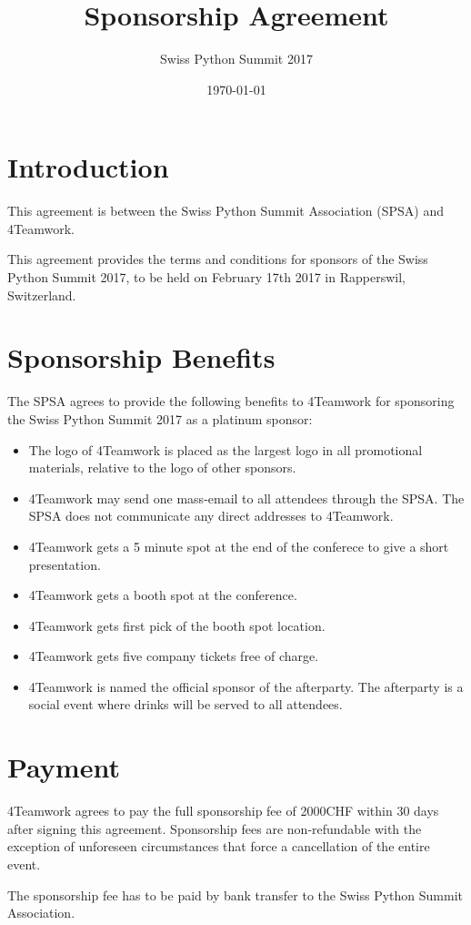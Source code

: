 \documentclass[11pt,enlargefirstpage=true,headlines=4]{scrartcl}
\title{Sponsorship Agreement}
\subtitle{Swiss Python Summit 2017}
\date{\today} %
\begin{document}
    \maketitle

    \section{Introduction}

    This agreement is between the Swiss Python Summit Association (SPSA) and
    4Teamwork.

    This agreement provides the terms and conditions for sponsors of the Swiss
    Python Summit 2017, to be held on February 17th 2017 in Rapperswil,
    Switzerland.

    \section{Sponsorship Benefits}

    The SPSA agrees to provide the following benefits to 4Teamwork for sponsoring
    the Swiss Python Summit 2017 as a platinum sponsor:

    \begin{itemize}
        \item The logo of 4Teamwork is placed as the largest logo in all promotional materials, relative to the logo of other sponsors.
        \item 4Teamwork may send one mass-email to all attendees through the SPSA. The SPSA does not communicate any direct addresses to 4Teamwork.
        \item 4Teamwork gets a 5 minute spot at the end of the conferece to give a short presentation.
        \item 4Teamwork gets a booth spot at the conference.
        \item 4Teamwork gets first pick of the booth spot location.
        \item 4Teamwork gets five company tickets free of charge.
        \item 4Teamwork is named the official sponsor of the afterparty. The afterparty is a social event where drinks will be served to all attendees.
    \end{itemize}

    \section{Payment}

    4Teamwork agrees to pay the full sponsorship fee of 2000CHF within 30 days
    after signing this agreement. Sponsorship fees are non‐refundable with the
    exception of unforeseen circumstances that force a cancellation of the entire
    event.

    The sponsorship fee has to be paid by bank transfer to the Swiss Python
    Summit Association.

    \hspace{\quad}
\end{document}
